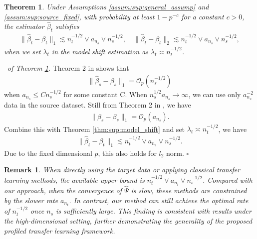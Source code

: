 \documentclass[12pt]{article}
\newtheorem{thm}{Theorem}
\newtheorem{remark}{Remark}
\newenvironment{pf}{{\noindent \it Proof}\ }{\hfill $\square$\par}
\begin{document}
\begin{thm}
    \label{thm:sup:target_estimation}
    Under Assumptions \ref{assum:sup:general_assump} and \ref{assum:sup:source_fixed}, with probability at least $1-p^{-c}$ for a constant $c>0$, the estimator $\hat{\beta}_t$ satisfies 
    \begin{align*}
       \|\hat{\beta}_t - \beta_t\|_1 \lesssim n_t^{-1/2} \vee a_{n_s} \vee n_s^{-1/2},\quad \|\hat{\beta}_t - \beta_t\|_2 \lesssim n_t^{-1/2} \vee a_{n_s} \vee n_s^{-1/2},
    \end{align*}
    when we set $\lambda_t$ in the model shift estimation as $\lambda_t \asymp n_t^{-1/2}$. 
\end{thm}

\begin{pf}{\it of Theorem \ref{thm:sup:target_estimation}. }
    Theorem 2 in \cite{tang2023synthetic} shows that 
    \begin{align*}
        \|\hat{\beta}_s - \beta_s\|_1 = \mathcal{O}_p(n_s^{-1/2})
    \end{align*}
    when $a_{n_s} \le C n_s^{-1/2}$ for some constant C. When $n_s^{1/2}a_{n_s}\rightarrow \infty$, we can use only $a_{n_s}^{-2}$ data in the source dataset. Still from Theorem 2 in \cite{tang2023synthetic}, we have
    \begin{align*}
        \|\hat{\beta}_s - \beta_s\|_1 = \mathcal{O}_p(a_{n_s}). 
    \end{align*}
    Combine this with Theorem \ref{thm:sup:model_shift} and set $\lambda_t \asymp n_t^{-1/2}$, we have 
    \begin{align*}
        \|\hat{\beta}_t - \beta_t\|_1 \lesssim n_t^{-1/2} \vee a_{n_s} \vee n_s^{-1/2}.
    \end{align*}
    Due to the fixed dimensional $p$, this also holds for $l_2$ norm. 
\end{pf}

\begin{remark}
    When directly using the target data or applying classical transfer learning methods, the available upper bound is $n_t^{-1/2}\vee a_{n_t} \vee n_s^{-1/2}$. Compared with our approach, when the convergence of $\hat{\Psi}$ is slow, these methods are constrained by the slower rate $a_{n_t}$. In contrast, our method can still achieve the optimal rate of $n_t^{-1/2}$ once $n_s$ is sufficiently large. This finding is consistent with results under the high-dimensional setting, further demonstrating the generality of the proposed profiled transfer learning framework.
\end{remark}
\end{document}
